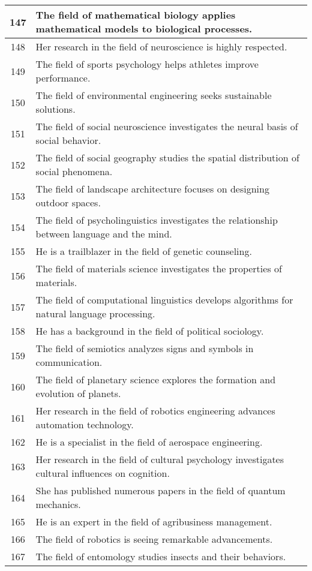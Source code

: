 \begin{longtable}{|c|p{12cm}|}
147 & The field of mathematical biology applies mathematical models to biological processes. \\ \hline
148 & Her research in the field of neuroscience is highly respected. \\ \hline
149 & The field of sports psychology helps athletes improve performance. \\ \hline
150 & The field of environmental engineering seeks sustainable solutions. \\ \hline
151 & The field of social neuroscience investigates the neural basis of social behavior. \\ \hline
152 & The field of social geography studies the spatial distribution of social phenomena. \\ \hline
153 & The field of landscape architecture focuses on designing outdoor spaces. \\ \hline
154 & The field of psycholinguistics investigates the relationship between language and the mind. \\ \hline
155 & He is a trailblazer in the field of genetic counseling. \\ \hline
156 & The field of materials science investigates the properties of materials. \\ \hline
157 & The field of computational linguistics develops algorithms for natural language processing. \\ \hline
158 & He has a background in the field of political sociology. \\ \hline
159 & The field of semiotics analyzes signs and symbols in communication. \\ \hline
160 & The field of planetary science explores the formation and evolution of planets. \\ \hline
161 & Her research in the field of robotics engineering advances automation technology. \\ \hline
162 & He is a specialist in the field of aerospace engineering. \\ \hline
163 & Her research in the field of cultural psychology investigates cultural influences on cognition. \\ \hline
164 & She has published numerous papers in the field of quantum mechanics. \\ \hline
165 & He is an expert in the field of agribusiness management. \\ \hline
166 & The field of robotics is seeing remarkable advancements. \\ \hline
167 & The field of entomology studies insects and their behaviors. \\ \hline

\end{longtable}
